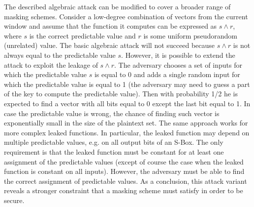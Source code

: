 

The described algebraic attack can be modified to cover a broader range of masking schemes. Consider a low-degree combination of vectors from the current window and assume that the function it computes can be expressed as $s\land r$, where $s$ is the correct predictable value and $r$ is some uniform pseudorandom (unrelated) value. The basic algebraic attack will not succeed because $s \land r$ is not always equal to the predictable value $s$. However, it is possible to extend the attack to exploit the leakage of $s \land r$. The adversary chooses a set of inputs for which the predictable value $s$ is equal to 0 and adds a single random input for which the predictable value is equal to 1 (the adversary may need to guess a part of the key to compute the predictable value). Then with probability 1/2 he is expected to find a vector with all bits equal to 0 except the last bit equal to 1. In case the predictable value is wrong, the chance of finding such vector is exponentially small in the size of the plaintext set. The same approach works for more complex leaked functions. In particular, the leaked function may depend on multiple predictable values, e.g. on all output bits of an S-Box. The only requirement is that the leaked function must be constant for at least one assignment of the predictable values (except of course the case when the leaked function is constant on all inputs). However, the adversary must be able to find the correct assignment of predictable values. As a conclusion, this attack variant reveals a stronger constraint that a masking scheme must satisfy in order to be secure.



